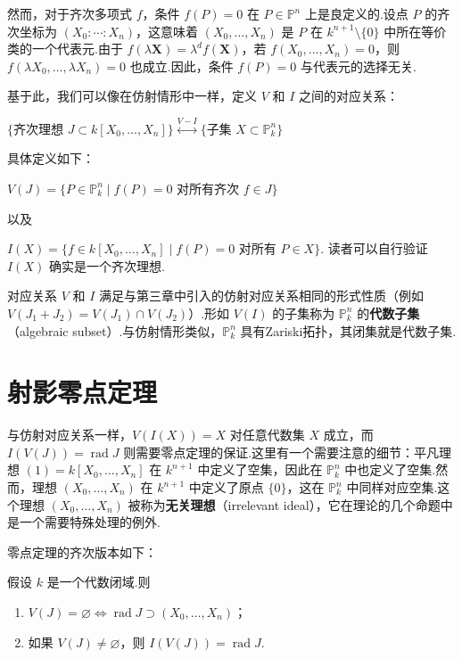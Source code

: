 然而，对于齐次多项式 \(f\)，条件 \(f(P) = 0\) 在 \(P \in {\mathbb{P}}^n\) 上是良定义的.设点 \(P\) 的齐次坐标为 \((X_0 : \cdots : X_n)\)，这意味着 \((X_0, \ldots, X_n)\) 是 \(P\) 在 \(k^{n+1} \setminus \{0\}\) 中所在等价类的一个代表元.由于 \(f(\lambda \mathbf{X}) = \lambda^d f(\mathbf{X})\)，若 \(f(X_0, \ldots, X_n) = 0\)，则 \(f(\lambda X_0, \ldots, \lambda X_n) = 0\) 也成立.因此，条件 \(f(P) = 0\) 与代表元的选择无关.

基于此，我们可以像在仿射情形中一样，定义 \(V\) 和 \(I\) 之间的对应关系：

\(
\{ \text{齐次理想 } J \subset k[X_0, \ldots, X_n] \} \overset{V-I}{\longleftrightarrow} \{ \text{子集 } X \subset {\mathbb{P}}_k^n \}
\)

具体定义如下：

\(
V(J) = \{ P \in {\mathbb{P}}_k^n \mid f(P) = 0 \text{ 对所有齐次 } f \in J \}
\)

以及

\(
I(X) = \{ f \in k[X_0, \ldots, X_n] \mid f(P) = 0 \text{ 对所有 } P \in X \}.
\)
读者可以自行验证 \(I(X)\) 确实是一个齐次理想.

对应关系 \(V\) 和 \(I\) 满足与第三章中引入的仿射对应关系相同的形式性质（例如 \(V(J_1 + J_2) = V(J_1) \cap V(J_2)\)）.形如 \(V(I)\) 的子集称为 \({\mathbb{P}}_k^n\) 的\textbf{代数子集}（algebraic subset）.与仿射情形类似，\({\mathbb{P}}_k^n\) 具有Zariski拓扑，其闭集就是代数子集.

\section{射影零点定理}

与仿射对应关系一样，\(V(I(X)) = X\) 对任意代数集 \(X\) 成立，而 \(I(V(J)) = \operatorname{rad}J\) 则需要零点定理的保证.这里有一个需要注意的细节：平凡理想 \((1) = k[X_0, \ldots, X_n]\) 在 \(k^{n+1}\) 中定义了空集，因此在 \({\mathbb{P}}_k^n\) 中也定义了空集.然而，理想 \((X_0, \ldots, X_n)\) 在 \(k^{n+1}\) 中定义了原点 \(\{0\}\)，这在 \({\mathbb{P}}_k^n\) 中同样对应空集.这个理想 \((X_0, \ldots, X_n)\) 被称为\textbf{无关理想}（irrelevant ideal），它在理论的几个命题中是一个需要特殊处理的例外.

零点定理的齐次版本如下：

\begin{theorem}[射影零点定理]
假设 \(k\) 是一个代数闭域.则
\begin{enumerate}
    \item[\upshape (i)] \(V(J) = \varnothing \Leftrightarrow \operatorname{rad}J \supset (X_0, \ldots, X_n)\)；
    \item[\upshape (ii)] 如果 \(V(J) \neq \varnothing\)，则 \(I(V(J)) = \operatorname{rad}J\).
\end{enumerate}
\end{theorem}

